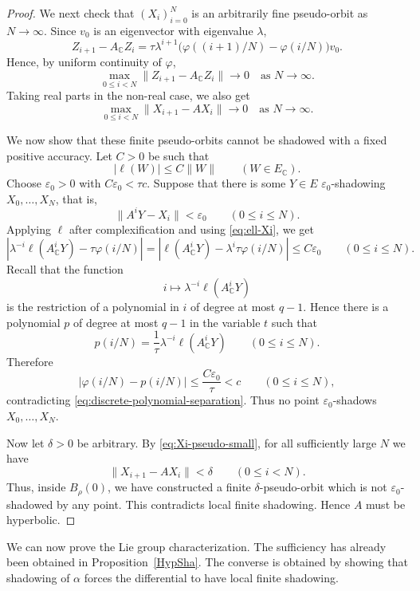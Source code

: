 \documentclass[12pt]{amsart}
\theoremstyle{definition}
\numberwithin{equation}{section}
\theoremstyle{remark}
\begin{document}
\begin{proof}
We next check that $(X_i)_{i=0}^N$ is an arbitrarily fine pseudo-orbit as
$N\to\infty$. Since $v_0$ is an eigenvector with eigenvalue $\lambda$,
\[
Z_{i+1}-A_{\mathbb C}Z_i
=
\tau\lambda^{i+1}
\bigl(\varphi((i+1)/N)-\varphi(i/N)\bigr)v_0.
\]
Hence, by uniform continuity of $\varphi$,
\[
\max_{0\leq i<N}\|Z_{i+1}-A_{\mathbb C}Z_i\|\to 0
\quad\text{as }N\to\infty.
\]
Taking real parts in the non-real case, we also get
\begin{equation}\label{eq:Xi-pseudo-small}
\max_{0\leq i<N}\|X_{i+1}-AX_i\|\to 0
\quad\text{as }N\to\infty.
\end{equation}

We now show that these finite pseudo-orbits cannot be shadowed with a fixed
positive accuracy. Let $C>0$ be such that
\[
|\ell(W)|\leq C\|W\|
\qquad (W\in E_{\mathbb C}).
\]
Choose $\varepsilon_0>0$ with $C\varepsilon_0<\tau c$.
Suppose that there is some $Y\in E$ $\varepsilon_0$-shadowing
$X_0,\ldots,X_N$, that is,
\[
\|A^iY-X_i\|<\varepsilon_0
\qquad (0\leq i\leq N).
\]
Applying $\ell$ after complexification and using \eqref{eq:ell-Xi}, we get
\[
\left|
\lambda^{-i}\ell(A_{\mathbb C}^iY)-\tau\varphi(i/N)
\right|
=
\left|
\ell(A_{\mathbb C}^iY)-\lambda^i\tau\varphi(i/N)
\right|
\leq C\varepsilon_0
\qquad (0\leq i\leq N).
\]
Recall that the function
\[
i\mapsto \lambda^{-i}\ell(A_{\mathbb C}^iY)
\]
is the restriction of a polynomial in $i$ of degree at most $q-1$. Hence
there is a polynomial $p$ of degree at most $q-1$ in the variable $t$ such
that
\[
p(i/N)=\frac{1}{\tau}\lambda^{-i}\ell(A_{\mathbb C}^iY)
\qquad (0\leq i\leq N).
\]
Therefore
\[
|\varphi(i/N)-p(i/N)|
\leq
\frac{C\varepsilon_0}{\tau}
<c
\qquad (0\leq i\leq N),
\]
contradicting \eqref{eq:discrete-polynomial-separation}. Thus no point
$\varepsilon_0$-shadows $X_0,\ldots,X_N$.

Now let $\delta>0$ be arbitrary. By \eqref{eq:Xi-pseudo-small}, for all
sufficiently large $N$ we have
\[
\|X_{i+1}-AX_i\|<\delta
\qquad (0\leq i<N).
\]
Thus, inside $B_\rho(0)$, we have constructed a finite $\delta$-pseudo-orbit
which is not $\varepsilon_0$-shadowed by any point. This contradicts
local finite shadowing. Hence $A$ must be hyperbolic.
\end{proof}






We can now prove the Lie group characterization. The sufficiency has already been obtained in Proposition~\ref{HypSha}. The converse is obtained by showing that shadowing of $\alpha$ forces the differential to have local finite shadowing.
\end{document}
